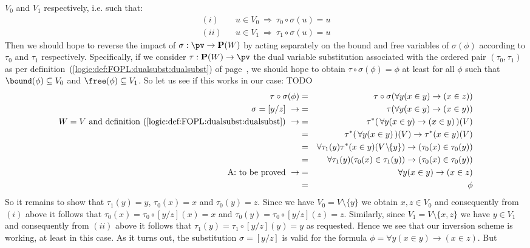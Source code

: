 $V_{0}$ and $V_{1}$ respectively, i.e. such that:
    \begin{eqnarray*}
    (i)&&u\in V_{0}\ \Rightarrow\ \tau_{0}\circ\sigma(u)=u\\
    (ii)&&u\in V_{1}\ \Rightarrow\ \tau_{1}\circ\sigma(u)=u
    \end{eqnarray*}
Then we should hope to reverse the impact of $\sigma:\pv\to{\bf
P}(W)$ by acting separately on the bound and free variables of
$\sigma(\phi)$ according to $\tau_{0}$ and $\tau_{1}$ respectively.
Specifically, if we consider $\tau:{\bf P}(W)\to\pv$ the dual
variable substitution associated with the ordered pair
$(\tau_{0},\tau_{1})$ as per
definition~(\ref{logic:def:FOPL:dualsubst:dualsubst}) of
page~\pageref{logic:def:FOPL:dualsubst:dualsubst}, we should hope to
obtain $\tau\circ\sigma(\phi)=\phi$ at least for all $\phi$ such
that $\bound(\phi)\subseteq V_{0}$ and $\free(\phi)\subseteq V_{1}$.
So let us see if this works in our case: TODO
    \begin{eqnarray*}
    \tau\circ\sigma(\phi)&=&\tau\circ\sigma(\forall y(x\in y)\to(x\in
    z))\\
    \sigma=[y/z]\ \rightarrow&=&\tau(\forall y(x\in y)\to(x\in y))\\
    \mbox{$W=V$ and definition~(\ref{logic:def:FOPL:dualsubst:dualsubst})}\
    \rightarrow
    &=&\tau^{*}(\,\forall y(x\in y)\to(x\in y)\,)(V)\\
    &=&\tau^{*}(\,\forall y(x\in y)\,)(V)\to\tau^{*}(x\in y)(V)\\
    &=&\forall \tau_{1}(y)\tau^{*}(x\in
    y)(V\!\setminus\!\!\{y\})\to(\tau_{0}(x)\in\tau_{0}(y))\\
    &=&\forall\tau_{1}(y)(\tau_{0}(x)\in
    \tau_{1}(y))\to(\tau_{0}(x)\in\tau_{0}(y))\\
    \mbox{A: to be proved}\ \rightarrow&=&\forall y(x\in y)\to(x\in z)\\
    &=&\phi
    \end{eqnarray*}
So it remains to show that $\tau_{1}(y)=y$, $\tau_{0}(x)=x$ and
$\tau_{0}(y)=z$. Since we have $V_{0}=V\setminus\{y\}$ we obtain
$x,z\in V_{0}$ and consequently from $(i)$ above it follows that
$\tau_{0}(x)=\tau_{0}\circ[y/z](x)=x$ and
$\tau_{0}(y)=\tau_{0}\circ[y/z](z)=z$. Similarly, since
$V_{1}=V\setminus\{x,z\}$ we have $y\in V_{1}$ and consequently from
$(ii)$ above it follows that $\tau_{1}(y)=\tau_{1}\circ[y/z](y)=y$
as requested. Hence we see that our inversion scheme is working, at
least in this case. As it turns out, the substitution $\sigma=[y/z]$
is valid for the formula $\phi=\forall y(x\in y)\to(x\in z)$. But

